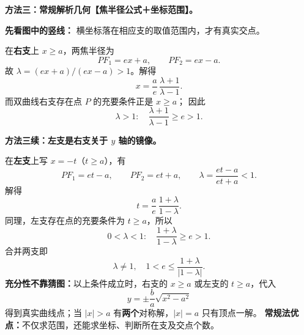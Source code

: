 \clearpage
\begin{proofbox}
\textbf{方法三：常规解析几何【焦半径公式＋坐标范围】。}
\begin{center}\end{center}
\textbf{先看图中的竖线：} 横坐标落在相应支的取值范围内，才有真实交点。

在\textbf{右支}上 $x\ge a$，两焦半径为
\[
PF_1=ex+a,\qquad PF_2=ex-a.
\]
故 $\lambda=(ex+a)/(ex-a)>1$。解得
\[
\boxed{x=\frac ae\,\frac{\lambda+1}{\lambda-1}}.
\]
而双曲线右支存在点 $P$ 的充要条件正是 $x\ge a$；
因此
\[
\lambda>1:\quad
\frac{\lambda+1}{\lambda-1}\ge e>1.
\]

\tcbbreak
\textbf{方法三续：左支是右支关于 $y$ 轴的镜像。}
\begin{center}\end{center}
在\textbf{左支}上写 $x=-t$（$t\ge a$），有
\[
PF_1=et-a,\qquad PF_2=et+a,
\qquad \lambda=\frac{et-a}{et+a}<1.
\]
解得
\[
\boxed{t=\frac ae\,\frac{1+\lambda}{1-\lambda}}.
\]
同理，左支存在点的充要条件为 $t\ge a$，所以
\[
0<\lambda<1:\quad
\frac{1+\lambda}{1-\lambda}\ge e>1.
\]
合并两支即
\[
\boxed{\lambda\ne1,\quad 1<e\le\frac{1+\lambda}{|1-\lambda|}}.
\]
\textbf{充分性不靠猜图：}以上条件成立时，右支的 $x\ge a$ 或左支的
$t\ge a$，代入
\[
\boxed{y=\pm\frac ba\sqrt{x^2-a^2}}
\]
得到真实曲线点；当 $|x|>a$ 有\textbf{两个}对称解，$|x|=a$ 只有顶点一解。
\textbf{常规法优点：}不仅求范围，还能求坐标、判断所在支及交点个数。
\end{proofbox}


